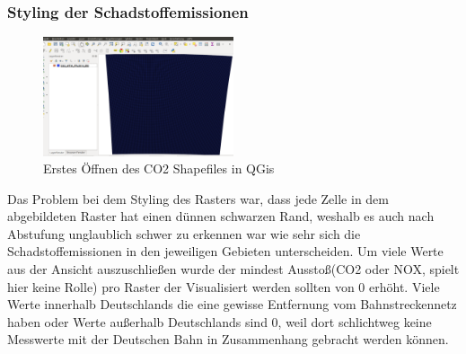 \subsubsection{Styling der Schadstoffemissionen}
\begin{figure}[h]
\centering
	\includegraphics[width=0.5\textwidth]{images/Raster_Input.png}
	\caption{Erstes Öffnen des CO2 Shapefiles in QGis}
\end{figure}
Das Problem bei dem Styling des  Rasters war, dass jede Zelle in dem abgebildeten Raster hat einen dünnen schwarzen Rand, weshalb es auch nach Abstufung unglaublich schwer zu erkennen war wie sehr sich die Schadstoffemissionen in den jeweiligen Gebieten unterscheiden. Um viele Werte aus der Ansicht auszuschließen wurde der mindest Ausstoß(CO2 oder NOX, spielt hier keine Rolle)  pro Raster der Visualisiert werden sollten von 0 erhöht. Viele Werte innerhalb Deutschlands die eine gewisse Entfernung vom Bahnstreckennetz haben oder Werte außerhalb Deutschlands sind 0, weil dort schlichtweg keine Messwerte mit der Deutschen Bahn in Zusammenhang gebracht werden können.
